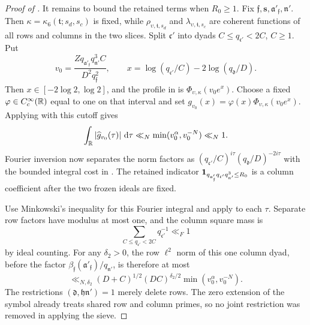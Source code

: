 \begin{proof}[Proof of ]
It remains to bound the retained terms when \(R_0\ge1\).  Fix
\(\mathfrak f,\mathbf s,\mathfrak a'_{\mathfrak f},\mathfrak n'\).
Then \(\kappa=\kappa_6(\mathfrak t;s_d,s_c)\) is fixed, while
\(\rho_{\upsilon,\mathfrak t,s_d}\) and
\(\lambda_{\upsilon,\mathfrak t,s_c}\) are coherent functions of all rows
and columns in the two slices.  Split \(\mathfrak c'\) into dyads
\(C\le q_{\mathfrak c'}<2C\), \(C\ge1\).  Put
\[
 v_0=\frac{Zq_{\mathfrak a'_{\mathfrak f}}q_{\mathfrak n'}^3C}
                {D^2q_{\mathfrak f}^2},\qquad
 x=\log(q_{\mathfrak c'}/C)-2\log(q_{\mathfrak d}/D).
\]
Then $x\in[-2\log2,\log2]$, and the profile in
 is $\Phi_{\upsilon,\kappa}(v_0e^x)$.
Choose a fixed $\varphi\in C_c^\infty(\mathbb{R})$ equal to one on that interval
and set $g_{v_0}(x)=\varphi(x)\Phi_{\upsilon,\kappa}(v_0e^x)$.  Applying
 with this cutoff gives
\begin{equation}\label{eq:reflection-Fourier-separation}
 \int_{\mathbb{R}}|\widehat g_{v_0}(\tau)|\,\,\mathrm{d}\tau
 \ll_N\min(v_0^\alpha,v_0^{-N})\ll_N1.
\end{equation}
Fourier inversion now separates the norm factors as
$(q_{\mathfrak c'}/C)^{i\tau}(q_{\mathfrak d}/D)^{-2i\tau}$ with the
bounded integral cost in .
The retained indicator
$\mathbf{1}_{q_{\mathfrak a'_{\mathfrak f}}q_{\mathfrak c'}q_{\mathfrak n'}^3\leq R_0}$
is a column coefficient after the two frozen ideals are fixed.

Use Minkowski's inequality for this Fourier integral and apply
 to each $\tau$.  Separate row factors
have modulus at most one, and the column square mass is
\[
 \sum_{C\leq q_{\mathfrak c'}<2C}q_{\mathfrak c'}^{-1}\ll_F1
\]
by ideal counting.  For any $\delta_2>0$, the row $\ell^2$ norm of this
one column dyad, before the factor
$\beta_{\mathfrak f}(\mathfrak a'_{\mathfrak f})/q_{\mathfrak n'}$, is
therefore at most
\begin{equation}\label{eq:reflection-one-column-dyad}
 \ll_{N,\delta_2}(D+C)^{1/2}(DC)^{\delta_2/2}
             \min(v_0^\alpha,v_0^{-N}).
\end{equation}
The restrictions $(\mathfrak d,\mathfrak h\mathfrak n')=1$ merely delete
rows.  The zero extension of the symbol already treats shared row and
column primes, so no joint restriction was removed in applying the sieve.


\end{proof}
